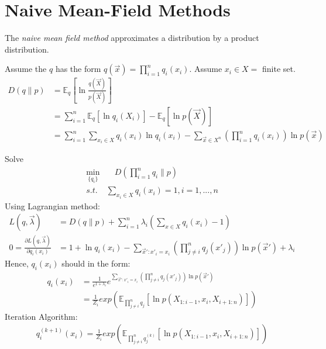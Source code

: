 \documentclass[11pt]{elegantbook}
\begin{document}
\section{Naive Mean-Field Methods}
The \textit{naive mean field method} approximates a distribution by a product distribution.

Assume the $q$ has the form $q(\vec{x})=\prod_{i=1}^nq_i (x_i)$. Assume $x_i\in X=$ finite set.
\begin{equation}
    \begin{aligned}
        D(q\| p)&=\mathbb{E}_q\left[\ln\frac{q(\vec{X})}{p(\vec{X})}\right]\\
        &=\sum_{i=1}^n \mathbb{E}_{q}\left[\ln q_i(X_i)\right]- \mathbb{E}_q\left[\ln p(\vec{X})\right]\\
        &=\sum_{i=1}^n\sum_{x_i\in X}q_i(x_i)\ln q_i(x_i)-\sum_{\vec{x}\in X^n}\left(\prod_{i=1}^nq_i (x_i)\right)\ln p(\vec{x})
    \end{aligned}
    \nonumber
\end{equation}

Solve 
\begin{equation}
    \begin{aligned}
        \min_{\{q_i\}}&\quad D(\prod_{i=1}^nq_i\| p)\\
        s.t.&\sum_{x_i\in X}q_i(x_i)=1,i=1,...,n
    \end{aligned}
    \nonumber
\end{equation}
Using Lagrangian method:
\begin{equation}
    \begin{aligned}
        L(q,\vec{\lambda})&=D(q\| p)+\sum_{i=1}^n\lambda_i\left(\sum_{x\in X}q_i(x_i)-1\right)\\
        0=\frac{\partial L(q,\vec{\lambda})}{\partial q_i(x_i)}&=1+\ln q_i(x_i)-\sum_{\vec{x}':x'_i=x_i}\left(\prod_{j\neq i}^nq_j (x'_j)\right)\ln p(\vec{x}')+\lambda_i
    \end{aligned}
    \nonumber
\end{equation}
Hence, $q_i(x_i)$ should in the form:
\begin{equation}
    \begin{aligned}
        q_i(x_i)&=\frac{1}{e^{1+\lambda_i}}e^{\sum_{\vec{x}':x'_i=x_i}\left(\prod_{j\neq i}^nq_j (x'_j)\right)\ln p(\vec{x}')}\\
        &=\frac{1}{Z_i}exp\left({\mathbb{E}_{\prod_{j\neq i}^nq_j}[\ln p(X_{1:i-1},x_i,X_{i+1:n})]}\right)
    \end{aligned}
    \nonumber
\end{equation}
Iteration Algorithm:
\begin{equation}
    \begin{aligned}
        q_i^{(k+1)}(x_i)=\frac{1}{Z_i}exp\left({\mathbb{E}_{\prod_{j\neq i}^nq_j^{(k)}}[\ln p(X_{1:i-1},x_i,X_{i+1:n})]}\right)
    \end{aligned}
    \nonumber
\end{equation}
\end{document}
